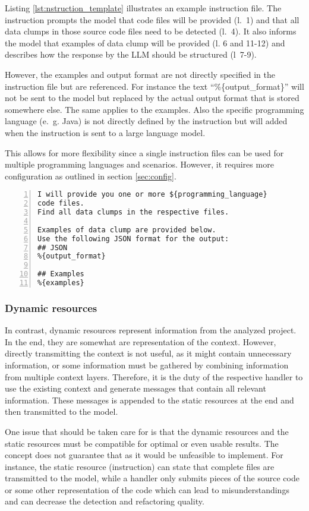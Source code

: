 Listing \ref{lst:nstruction_template} illustrates an example instruction file.  The instruction prompts the model that code files will be provided (l.~1) and that all data clumps in those source code files need to be detected (l.~4). It also informs the model that examples of data clump will be provided (l. 6 and 11-12) and describes how the response by the \ac{LLM} should be structured (l~7-9). 

However, the examples and output format are not directly specified in the instruction file but are referenced. For instance the text \enquote{\%\{output\_format\}} will not be sent to the model but replaced by the actual output format that is stored somewhere else. The same applies to the examples. Also the specific programming language (e.~g. Java) is not directly defined by the instruction but will added when the instruction is sent to a large language model.

This allows for more flexibility since a single instruction files can be used for multiple programming languages and scenarios. However, it requires more configuration as outlined in section \ref{sec:config}.
\begin{lstlisting}[caption={Instruction file example}, label={lst:nstruction_template}, captionpos=b, numbers=left, ]
I will provide you one or more ${programming_language}
code files.
Find all data clumps in the respective files.

Examples of data clump are provided below.
Use the following JSON format for the output:
## JSON
%{output_format}

## Examples
%{examples}
\end{lstlisting}


\hfill
\subsubsection{Dynamic resources}

In contrast, dynamic resources represent information from the analyzed project. In the end, they are somewhat are representation of the context. However, directly transmitting the context is not useful, as it might contain unnecessary information, or some information must be gathered by combining information from multiple context layers. Therefore, it is the duty of the respective handler to use the existing context and generate messages that contain all relevant information. These messages is appended to the static resources at the end and then transmitted to the model. 

One issue that should be taken care for is that the dynamic resources and the static resources must be compatible for optimal or even usable results. The concept does not guarantee that as it would be unfeasible to implement. For instance, the static resource (instruction) can state that complete files are transmitted to the model, while a handler only submits pieces of the source code or some other representation of the code which can lead to misunderstandings and can decrease the detection and refactoring quality. 
